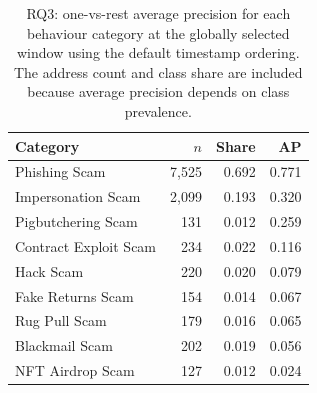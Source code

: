 \begin{table}[ht]
\centering
\caption{RQ3: one-vs-rest average precision for each behaviour category at the globally selected window using the default timestamp ordering. The address count and class share are included because average precision depends on class prevalence.}
\label{tab:res_rq3_labels}
\small
\begin{tabular}{@{}l r r r@{}}
\toprule
\textbf{Category} & \textbf{$n$} & \textbf{Share} & \textbf{AP} \\
\midrule
Phishing Scam & 7,525 & 0.692 & 0.771 \\
Impersonation Scam & 2,099 & 0.193 & 0.320 \\
Pigbutchering Scam & 131 & 0.012 & 0.259 \\
Contract Exploit Scam & 234 & 0.022 & 0.116 \\
Hack Scam & 220 & 0.020 & 0.079 \\
Fake Returns Scam & 154 & 0.014 & 0.067 \\
Rug Pull Scam & 179 & 0.016 & 0.065 \\
Blackmail Scam & 202 & 0.019 & 0.056 \\
NFT Airdrop Scam & 127 & 0.012 & 0.024 \\
\bottomrule
\end{tabular}
\end{table}
